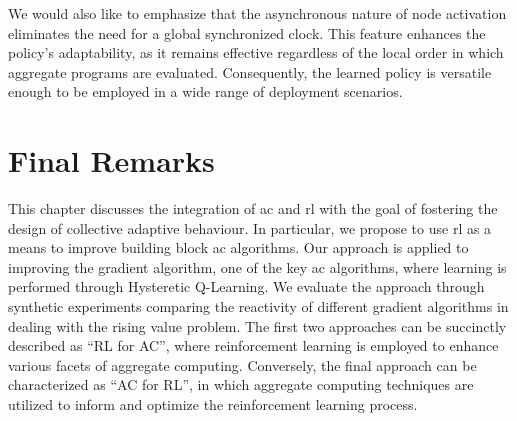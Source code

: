 We would also like to emphasize that the asynchronous nature of node activation eliminates the need for a global synchronized clock. 
 This feature enhances the policy's adaptability, as it remains effective regardless of the local order in which aggregate programs are evaluated. Consequently, the learned policy is versatile enough to be employed in a wide range of deployment scenarios.
\section{Final Remarks}\label{coordination2022:s:conc}

This chapter discusses the integration of \acl{ac} and \acl{rl} with the goal of fostering the design of collective adaptive behaviour.
% 
In particular, we propose to use \ac{rl} as a means to improve building block \ac{ac} algorithms. %
%
Our approach is applied to improving the gradient algorithm, one of the key \ac{ac} algorithms, where learning is performed through Hysteretic Q-Learning.
%
We evaluate the approach through synthetic experiments comparing the reactivity of different gradient algorithms in dealing with the rising value problem.
%
The first two approaches can be succinctly described as ``RL for AC'', 
 where reinforcement learning is employed to enhance various facets of aggregate computing. 
 Conversely, the final approach can be characterized as ``AC for RL'', in which aggregate computing techniques are utilized to inform and optimize the reinforcement learning process.
